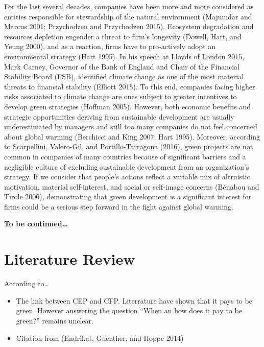 \documentclass[12pt,]{article}
\begin{document}
For the last several decades, companies have been more and more
considered as entities responsible for stewardship of the natural
environment (Majumdar and Marcus 2001; Przychodzen and Przychodzen
2015). Ecosystem degradation and resources depletion engender a threat
to firm's longevity (Dowell, Hart, and Yeung 2000), and as a reaction,
firms have to pro-actively adopt an environmental strategy (Hart 1995).
In his speech at Lloyds of London 2015, Mark Carney, Governor of the
Bank of England and Chair of the Financial Stability Board (FSB),
identified climate change as one of the most material threats to
financial stability (Elliott 2015). To this end, companies facing higher
risks associated to climate change are ones subject to greater
incentives to develop green strategies (Hoffman 2005). However, both
economic benefits and strategic opportunities deriving from sustainable
development are usually underestimated by managers and still too many
companies do not feel concerned about global warming (Berchicci and King
2007; Hart 1995). Moreover, according to Scarpellini, Valero-Gil, and
Portillo-Tarragona (2016), green projects are not common in companies of
many countries because of significant barriers and a negligible culture
of excluding sustainable development from an organization's strategy. If
we consider that people's actions reflect a variable mix of altruistic
motivation, material self-interest, and social or self-image concerns
(Bénabou and Tirole 2006), demonstrating that green development is a
significant interest for firms could be a serious step forward in the
fight against global warming.

\textbf{To be continued\ldots{}}

\FloatBarrier
\newpage
{}

\section{Literature Review}\label{literature-review}

According to\ldots{}

\begin{itemize}
\item
  The link between CEP and CFP. Literrature have shown that it pays to
  be green. However answering the question ``When an how does it pay to
  be green?'' remains unclear.
\item
  Citation from (Endrikat, Guenther, and Hoppe 2014)
\end{itemize}
\end{document}
